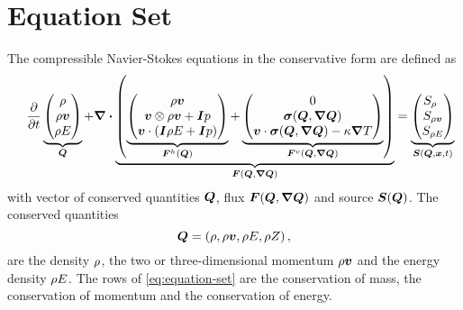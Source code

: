\documentclass[runningheads]{llncs}
\newcommand{\eqA}{}
\newcommand{\eqB}{(}
\newcommand{\eqMultiA}{(}
\newcommand{\eqMultiB}{)}
\DeclareRobustCommand{\pcrefSingle}[1]{%
\begingroup%
  \renewcommand{\eqA}{(}\renewcommand{\eqB}{}%
\cref{#1}%
\endgroup%
}
\DeclareRobustCommand{\pcrefMulti}[1]{%
\begingroup%
    \renewcommand{\eqMultiA}{}\renewcommand{\eqMultiB}{}%
    (\cref{#1})%
\endgroup%
}
\DeclareRobustCommand{\pcref}[1]{%
\IfSubStr{#1}{,}{\pcrefMulti{#1}}{\pcrefSingle{#1}}%
}
\begin{document}
\section{Equation Set}
\newcommand{\diffCoeff}{\varepsilon}%
\newcommand{\hyperFluxDef}{
  \begin{pmatrix}
    \Qj \\
    \Qv  \otimes \Qj + \bm{I} \pressure  \\
    \Qv \cdot (\bm{I} \QE + \bm{I} \pressure)
  \end{pmatrix}
}%
\newcommand{\viscFluxDef}{
  \begin{pmatrix}
    0\\
     \stressT (\Q, \gradQ)  \\
     \Qv \cdot \stressT (\Q, \gradQ) - \kappa \gradient{T}
   \end{pmatrix}
}%
The compressible Navier-Stokes equations in the conservative form are defined as%
\begin{equation}
 \label{eq:equation-set} 
\quad
  \pdv{}{t}
  \underbrace{
  \begin{pmatrix}
    \Qrho\\
    \Qj\\
    \QE
    \end{pmatrix}}_{\Q}
  +
  \divergence{
  \underbrace{
  \left(
   \underbrace{\hyperFluxDef}_{\hyperFlux(\Q)}
+
\underbrace{\viscFluxDef}_{\viscFlux(\Q, \gradQ)}
  \right)}_{\flux(\Q, \gradQ)}}
 =
  \underbrace{
  \begin{pmatrix}
    \source[\Qrho\phantom{\Qrho}]\\
    \source[\Qj]\\
    \source[\QE]
    \end{pmatrix}}_{\source(\Q, \bm{x}, t)}
\end{equation}
with vector of conserved quantities $\bm{Q}$, flux $\flux(\Q, \gradQ)$ and source $\source(\Q)$.
The conserved quantities
\begin{equation} 
  \label{eq:conserved-variables}
 \bm{Q} = \left( \rho, \rho \bm{v}, \rho E, \rho Z \right),
\end{equation}
are the density $\rho$, the two or three-dimensional momentum $\rho \bm{v}$ and the energy density $\rho E$.
The rows of \cref{eq:equation-set} are the conservation of mass, the conservation of momentum and the conservation of energy.
\end{document}
